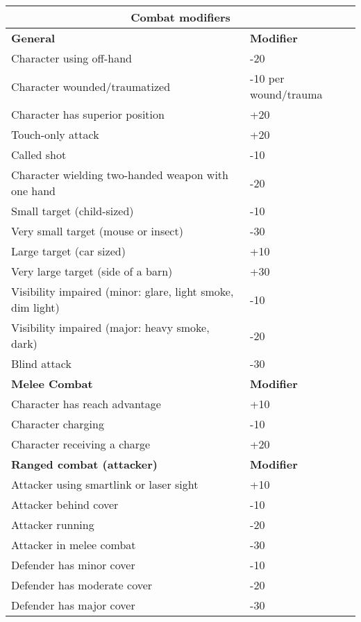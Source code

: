 \begin{table}
\begin{tabularx}{\textwidth}{|X|l|}
\hline
\multicolumn{2}{|c|}{\textbf{Combat modifiers}}			\\
\hline
\textbf{General} 					& \textbf{Modifier}		\\
\hline
Character using off-hand				& -20				\\
\hline
Character wounded/traumatized			& -10 per wound/trauma	\\
\hline
Character has superior position		& +20				\\
\hline
Touch-only attack					& +20				\\
\hline
Called shot						& -10				\\
\hline
Character wielding two-handed weapon with one hand & -20		\\
\hline
Small target (child-sized)			& -10				\\
\hline
Very small target (mouse or insect)	& -30				\\
\hline
Large target (car sized) 			& +10				\\
\hline
Very large target (side of a barn) 	& +30				\\
\hline
Visibility impaired (minor: glare, light smoke, dim light) & -10	\\
\hline
Visibility impaired (major: heavy smoke, dark) & -20			\\
\hline
Blind attack 						& -30				\\
\hline
\textbf{Melee Combat} 				& \textbf{Modifier}		\\
\hline
Character has reach advantage 		& +10				\\
\hline
Character charging 					& -10				\\
\hline
Character receiving a charge 			& +20				\\
\hline
\textbf{Ranged combat (attacker)} 		& \textbf{Modifier}		\\
\hline
Attacker using smartlink or laser sight	& +10				\\
\hline
Attacker behind cover 				& -10				\\
\hline
Attacker running 					& -20				\\
\hline
Attacker in melee combat 			& -30				\\
\hline
Defender has minor cover 			& -10				\\
\hline
Defender has moderate cover 			& -20				\\
\hline
Defender has major cover 			& -30				\\

\end{tabularx}
\end{table}
